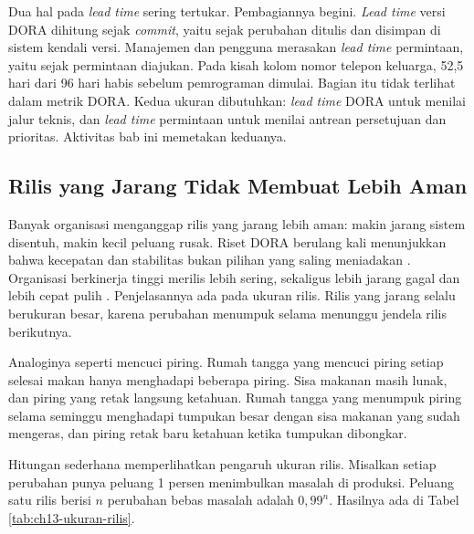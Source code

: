 Dua hal pada \textit{lead time} sering tertukar. Pembagiannya begini. \textit{Lead time} versi
DORA dihitung sejak \textit{commit}, yaitu sejak perubahan ditulis dan disimpan di sistem kendali
versi. Manajemen dan pengguna merasakan \textit{lead time} permintaan, yaitu sejak permintaan
diajukan. Pada kisah kolom nomor telepon keluarga, 52,5 hari dari 96 hari habis sebelum
pemrograman dimulai. Bagian itu tidak terlihat dalam metrik DORA. Kedua ukuran dibutuhkan:
\textit{lead time} DORA untuk menilai jalur teknis, dan \textit{lead time} permintaan untuk
menilai antrean persetujuan dan prioritas. Aktivitas bab ini memetakan keduanya.

\subsection{Rilis yang Jarang Tidak Membuat Lebih Aman}

Banyak organisasi menganggap rilis yang jarang lebih aman: makin jarang sistem disentuh, makin
kecil peluang rusak. Riset DORA berulang kali menunjukkan bahwa kecepatan dan stabilitas bukan
pilihan yang saling meniadakan \cite{dora-metrics}. Organisasi berkinerja tinggi merilis lebih
sering, sekaligus lebih jarang gagal dan lebih cepat pulih \cite{c13-forsgren2018}. Penjelasannya
ada pada ukuran rilis. Rilis yang jarang selalu berukuran besar, karena perubahan menumpuk selama
menunggu jendela rilis berikutnya.

Analoginya seperti mencuci piring. Rumah tangga yang mencuci piring setiap selesai makan hanya
menghadapi beberapa piring. Sisa makanan masih lunak, dan piring yang retak langsung ketahuan.
Rumah tangga yang menumpuk piring selama seminggu menghadapi tumpukan besar dengan sisa makanan yang
sudah mengeras, dan piring retak baru ketahuan ketika tumpukan dibongkar.

Hitungan sederhana memperlihatkan pengaruh ukuran rilis. Misalkan setiap perubahan punya peluang
1 persen menimbulkan masalah di produksi. Peluang satu rilis berisi $n$ perubahan bebas masalah
adalah $0{,}99^n$. Hasilnya ada di Tabel \ref{tab:ch13-ukuran-rilis}.

